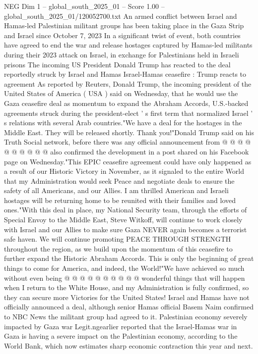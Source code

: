 \begin{textsample}{NEG Dim 1 – global\_south\_2025\_01 – Score 1.00 – global\_south\_2025\_01/120052700.txt}  \label{ex:f1_neg_156}
An armed conflict between Israel and Hamas-led Palestinian militant groups has been taking place in the Gaza Strip and Israel since October 7, 2023 In a significant twist of event, both countries have agreed to end the war and release hostages captured by Hamas-led militants during their 2023 attack on Israel, in exchange for Palestinians held in Israeli prisons The incoming US President Donald Trump has reacted to the deal reportedly struck by Israel and Hamas Israel-Hamas ceasefire : Trump reacts to agreement As reported by Reuters, Donald Trump, the incoming president of the United States of America ( USA ) said on Wednesday, that he would use the Gaza ceasefire deal as momentum to expand the Abraham Accords, U.S.-backed agreements struck during the president-elect ' s first term that normalized Israel ' s relations with several Arab countries."We have a deal for the hostages in the Middle East.
They will be released shortly.
Thank you!"Donald Trump said on his Truth Social network, before there was any official announcement from @ @ @ @ @ @ @ @ @ @ also confirmed the development in a post shared on his Facebook page on Wednesday."This EPIC ceasefire agreement could have only happened as a result of our Historic Victory in November, as it signaled to the entire World that my Administration would seek Peace and negotiate deals to ensure the safety of all Americans, and our Allies.
I am thrilled American and Israeli hostages will be returning home to be reunited with their families and loved ones."With this deal in place, my National Security team, through the efforts of Special Envoy to the Middle East, Steve Witkoff, will continue to work closely with Israel and our Allies to make sure Gaza NEVER again becomes a terrorist safe haven.
We will continue promoting PEACE THROUGH STRENGTH throughout the region, as we build upon the momentum of this ceasefire to further expand the Historic Abraham Accords.
This is only the beginning of great things to come for America, and indeed, the World!"We have achieved so much without even being @ @ @ @ @ @ @ @ @ @ wonderful things that will happen when I return to the White House, and my Administration is fully confirmed, so they can secure more Victories for the United States!
Israel and Hamas have not officially announced a deal, although senior Hamas official Basem Naim confirmed to NBC News the militant group had agreed to it.
Palestinian economy severely impacted by Gaza war Legit.ngearlier reported that the Israel-Hamas war in Gaza is having a severe impact on the Palestinian economy, according to the World Bank, which now estimates sharp economic contraction this year and next.

\end{textsample}
